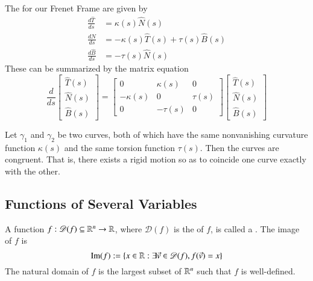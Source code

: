 \begin{appendices}
    \begin{prop}
        The  for our Frenet Frame are given by \begin{align*}
            \frac{d\hat{T}}{ds} &= \kappa(s)\hat{N}(s) \\
            \frac{d\hat{N}}{ds} &= -\kappa(s)\hat{T}(s)+\tau(s) \hat{B}(s) \\
            \frac{d\hat{B}}{ds} &= -\tau(s)\hat{N}(s)
        \end{align*}
        These can be summarized by the matrix equation \begin{equation*}
            \frac{d}{ds}\begin{bmatrix} \hat{T}(s) \\ \hat{N}(s) \\ \hat{B}(s) \end{bmatrix} = \begin{bmatrix} 0 & \kappa(s) & 0 \\ -\kappa(s) & 0 & \tau(s) \\ 0 & -\tau(s) & 0 \end{bmatrix} \begin{bmatrix} \hat{T}(s) \\ \hat{N}(s) \\ \hat{B}(s) \end{bmatrix} 
        \end{equation*}
    \end{prop}

    \begin{thm}
        Let $\gamma_1$ and $\gamma_2$ be two curves, both of which have the same nonvanishing curvature function $\kappa(s)$ and the same torsion function $\tau(s)$. Then the curves are congruent. That is, there exists a rigid motion so as to coincide one curve exactly with the other.
    \end{thm}





    \subsection{Functions of Several Variables}

    \begin{defn}
        A function $f:\mathscr{D}(f) \subseteq \mathbb R^n\rightarrow \mathbb R$, where $\mathscr{D}(f)$ is the  of $f$, is called a . The image of $f$ is \begin{equation}
            \operatorname{Im}(f):=\{x \in \mathbb R:\exists\vec{v} \in \mathscr{D}(f), f(\vec{v}) = x\}
        \end{equation}
        The natural domain of $f$ is the largest subset of $\mathbb R^n$ such that $f$ is well-defined.
    \end{defn}


\end{appendices}
